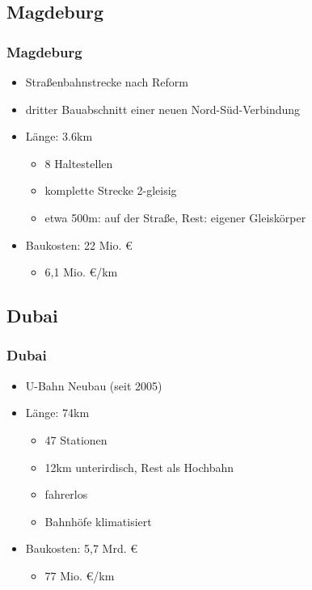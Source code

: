 \documentclass[xcolor=dvipsnames]{beamer}
\begin{document}
\subsection{Magdeburg}
\begin{frame}
  \frametitle{Magdeburg}

  \begin{itemize}
  \item Straßenbahnstrecke nach Reform
  \item dritter Bauabschnitt einer neuen Nord-Süd-Verbindung
  \item Länge: 3.6km
    \begin{itemize}
    \item 8 Haltestellen
    \item komplette Strecke 2-gleisig
    \item etwa 500m: auf der Straße, Rest: eigener Gleiskörper
    \end{itemize}
  \item Baukosten: 22 Mio. €
    \begin{itemize}
    \item 6,1 Mio. €/km
    \end{itemize}
  \end{itemize}
\end{frame}


\subsection{Dubai}
\begin{frame}
  \frametitle{Dubai}

  \begin{itemize}
  \item U-Bahn Neubau (seit 2005)
  \item Länge: 74km
    \begin{itemize}
    \item 47 Stationen
    \item 12km unterirdisch, Rest als Hochbahn
    \item fahrerlos
    \item Bahnhöfe klimatisiert
    \end{itemize}
  \item Baukosten: 5,7 Mrd. €
    \begin{itemize}
    \item 77 Mio. €/km
    \end{itemize}
  \end{itemize}
\end{frame}
\end{document}
